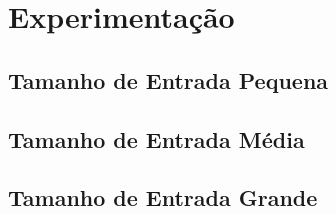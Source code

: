 \chapter{Experimentação}

\section{Tamanho de Entrada Pequena}

\section{Tamanho de Entrada Média}

\section{Tamanho de Entrada Grande}
